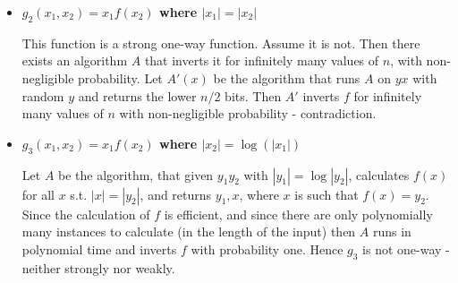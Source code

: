 \documentclass[11pt]{article} \usepackage{amssymb}
\begin{document}
\begin{enumerate}
\begin{itemize}
  \item {\bf $g_2(x_1,x_2) = x_1 f(x_2)$ where $|x_1|=|x_2|$}

    This function is a strong one-way function. Assume it is not. Then there
    exists an algorithm $A$ that inverts it for infinitely many values of $n$,
    with non-negligible probability. Let $A'(x)$ be the algorithm that runs
    $A$ on $yx$ with random $y$ and returns the lower $n/2$ bits. 
    Then $A'$ inverts $f$ for
    infinitely many values of $n$ with non-negligible probability - 
    contradiction.
    
  \item {\bf $g_3(x_1,x_2) = x_1 f(x_2)$ where $|x_2|=\log(|x_1|)$}
    
    Let $A$ be the algorithm, that given $y_1y_2$ with $|y_1|=\log|y_2|$, 
    calculates $f(x)$ for all $x$ s.t. $|x|=|y_2|$, and returns $y_1,x$, 
    where $x$ is such that $f(x)=y_2$. Since the calculation of $f$ 
    is efficient, and since there are only polynomially many instances to
    calculate (in the length of the input) then $A$ runs in polynomial
    time and inverts $f$ with probability one. Hence $g_3$ is not one-way - 
    neither strongly nor weakly.
  \end{itemize}
\end{enumerate}
\end{document}
